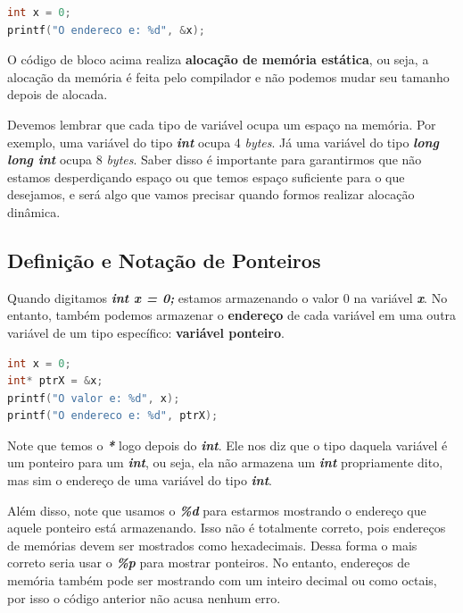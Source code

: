 \begin{lstlisting}[language=C]
int x = 0;
printf("O endereco e: %d", &x);
\end{lstlisting}

O código de bloco acima realiza \textbf{alocação de memória estática}, ou seja, a alocação da memória
é feita pelo compilador e não podemos mudar seu tamanho depois de alocada.

Devemos lembrar que cada tipo de variável ocupa um espaço na memória. Por exemplo, uma variável
do tipo \textbf{\textit{int}} ocupa 4 \textit{bytes}. Já uma variável do tipo \textbf{\textit{long long int}} ocupa 8 \textit{bytes}.
Saber disso é importante para garantirmos que não estamos desperdiçando espaço ou que temos espaço suficiente
para o que desejamos, e será algo que vamos precisar quando formos realizar alocação dinâmica.

\subsection{Definição e Notação de Ponteiros}
Quando digitamos \textbf{\textit{int x = 0;}} estamos armazenando o valor 0 na variável \textbf{\textit{x}}. No entanto,
também podemos armazenar o \textbf{endereço} de cada variável em uma outra variável de um tipo específico:
\textbf{variável ponteiro}.

\begin{lstlisting}[language=C]
int x = 0;
int* ptrX = &x;
printf("O valor e: %d", x);
printf("O endereco e: %d", ptrX);
\end{lstlisting}

Note que temos o \textbf{\textit{*}} logo depois do \textbf{\textit{int}}. Ele nos diz que o tipo daquela variável é um
ponteiro para um \textbf{\textit{int}}, ou seja, ela não armazena um \textbf{\textit{int}} propriamente dito, mas sim o
endereço de uma variável do tipo \textbf{\textit{int}}.

Além disso, note que usamos o \textbf{\textit{\%d}} para estarmos mostrando o endereço que aquele
ponteiro está armazenando. Isso não é totalmente correto, pois endereços de memórias devem ser mostrados
como hexadecimais. Dessa forma o mais correto seria usar o \textbf{\textit{\%p}} para mostrar ponteiros. No entanto,
endereços de memória também pode ser mostrando com um inteiro decimal ou como octais,
por isso o código anterior não acusa nenhum erro.


